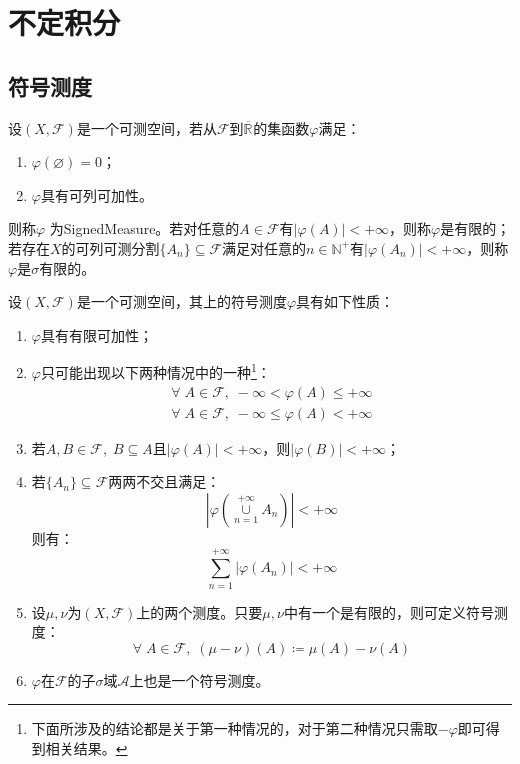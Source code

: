 \section{不定积分}

\subsection{符号测度}
\begin{definition}
	设$(X,\mathscr{F})$是一个可测空间，若从$\mathscr{F}$到$\overline{\mathbb{R}^{}}$的集函数$\varphi$满足：
	\begin{enumerate}
		\item $\varphi(\varnothing)=0$；
		\item $\varphi$具有可列可加性。
	\end{enumerate}
	则称$\varphi$	为\gls{SignedMeasure}。若对任意的$A\in\mathscr{F}$有$|\varphi(A)|<+\infty$，则称$\varphi$是有限的；若存在$X$的可列可测分割$\{A_n\}\subseteq\mathscr{F}$满足对任意的$n\in\mathbb{N}^+$有$|\varphi(A_n)|<+\infty$，则称$\varphi$是$\sigma$有限的。
\end{definition}
\begin{property}\label{prop:SignedMeasure}
	设$(X,\mathscr{F})$是一个可测空间，其上的符号测度$\varphi$具有如下性质：
	\begin{enumerate}
		\item $\varphi$具有有限可加性；
		\item $\varphi$只可能出现以下两种情况中的一种\footnote{下面所涉及的结论都是关于第一种情况的，对于第二种情况只需取$-\varphi$即可得到相关结果。}：
		\begin{gather*}
			\forall\;A\in\mathscr{F},\;-\infty<\varphi(A)\leqslant+\infty \\
			\forall\;A\in\mathscr{F},\;-\infty\leqslant\varphi(A)<+\infty
		\end{gather*}
		\item 若$A,B\in\mathscr{F},\;B\subseteq A$且$|\varphi(A)|<+\infty$，则$|\varphi(B)|<+\infty$；
		\item 若$\{A_n\}\subseteq\mathscr{F}$两两不交且满足：
		\begin{equation*}
			\left|\varphi\left(\underset{n=1}{\overset{+\infty}{\cup}}A_n\right)\right|<+\infty
		\end{equation*}
		则有：
		\begin{equation*}
			\sum_{n=1}^{+\infty}|\varphi(A_n)|<+\infty
		\end{equation*}
		\item 设$\mu,\nu$为$(X,\mathscr{F})$上的两个测度。只要$\mu,\nu$中有一个是有限的，则可定义符号测度：
		\begin{equation*}
			\forall\;A\in\mathscr{F},\;(\mu-\nu)(A)\coloneq\mu(A)-\nu(A)
		\end{equation*}
		\item $\varphi$在$\mathscr{F}$的子$\sigma$域$\mathscr{A}$上也是一个符号测度。
	\end{enumerate}
\end{property}
